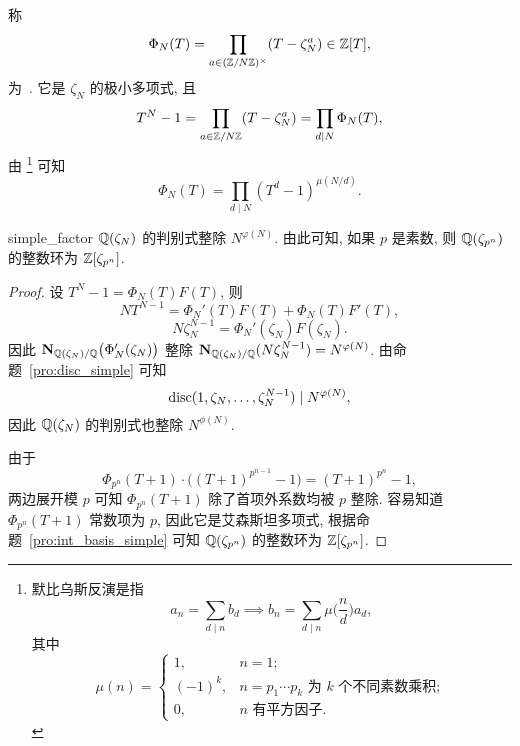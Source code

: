 称 
  \[\Phi_N(T)=\prod_{a\in({\mathbb{Z}}/N{\mathbb{Z}})^\times} (T-\zeta_N^a)\in{\mathbb{Z}}[T],\]
为\ .
它是 $\zeta_N$ 的极小多项式, 且
	\[T^N-1=\prod_{a\in{\mathbb{Z}}/N{\mathbb{Z}}}(T-\zeta_N^a)=\prod_{d\mid N}\Phi_N(T),\]
由%
\footnote{
  默比乌斯反演是指
    \[a_n=\sum_{d\mid n}b_d\implies
    b_n=\sum_{d\mid n}\mu\bigl(\frac nd\bigr)a_d,\]
  其中
  \[\mu(n)=\begin{cases}
    1,&n=1;\\
    (-1)^k,&n=p_1\cdots p_k\text{ 为 $k$ 个不同素数乘积};\\
    0,&n\text{ 有平方因子}.
  \end{cases}\]
}%
可知
  \[\Phi_N(T)=\prod_{d\mid N}(T^d-1)^{\mu(N/d)}.\]

\begin{proposition}{}{simple_factor}
${\mathbb{Q}}(\zeta_N)$ 的判别式整除 $N^{\varphi(N)}$. 由此可知, 如果 $p$ 是素数, 则 ${\mathbb{Q}}(\zeta_{p^n})$ 的整数环为 ${\mathbb{Z}}[\zeta_{p^n}]$.
\end{proposition}
\begin{proof}
设 $T^N-1=\Phi_N(T)F(T)$, 则
  \[NT^{N-1}=\Phi_N'(T)F(T)+\Phi_N(T)F'(T),\]
  \[N\zeta_N^{N-1}=\Phi_N'(\zeta_N)F(\zeta_N).\]
因此 ${\mathbf{N}}_{{\mathbb{Q}}(\zeta_N)/{\mathbb{Q}}}\bigl(\Phi'_N(\zeta_N)\bigr)$ 整除 ${\mathbf{N}}_{{\mathbb{Q}}(\zeta_N)/{\mathbb{Q}}}(N\zeta_N^{N-1})=N^{\varphi(N)}$. 由命题~\ref{pro:disc_simple} 可知 
	\[{\mathrm{disc}}(1,\zeta_N,\dots,\zeta_N^{N-1})\mid N^{\varphi(N)},\] 
因此 ${\mathbb{Q}}(\zeta_N)$ 的判别式也整除 $N^{\phi(N)}$.

由于
  \[\Phi_{p^n}(T+1)\cdot \bigl((T+1)^{p^{n-1}}-1\bigr)=(T+1)^{p^n}-1,\]
两边展开模 $p$ 可知 $\Phi_{p^n}(T+1)$ 除了首项外系数均被 $p$ 整除. 容易知道 $\Phi_{p^n}(T+1)$ 常数项为 $p$, 因此它是艾森斯坦多项式, 根据命题~\ref{pro:int_basis_simple} 可知 ${\mathbb{Q}}(\zeta_{p^n})$ 的整数环为 ${\mathbb{Z}}[\zeta_{p^n}]$.
\end{proof}


